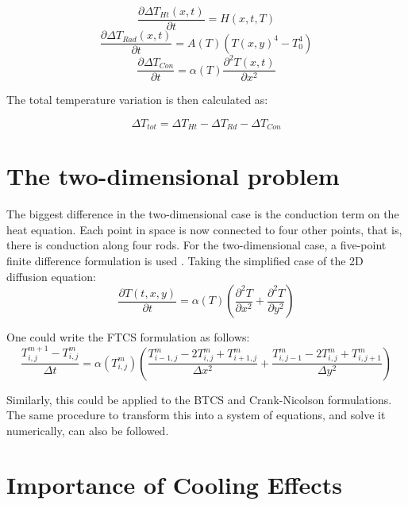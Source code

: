 \begin{equation}
    \frac{\partial \Delta T_{Ht} (x,t)}{\partial t} = H(x,t,T)
\end{equation}
\begin{equation}
    \frac{\partial \Delta T_{Rad} (x,t)}{\partial t} = A(T) \left(T(x,y)^4 - T_0^4\right)
\end{equation}
\begin{equation}
    \frac{\partial \Delta T_{Con}}{\partial t} = \alpha(T)\frac{\partial^2 T(x,t)}{\partial x^2}
\end{equation}

The total temperature variation is then calculated as: 

\begin{equation}
    \Delta T_{tot} = \Delta T_{Ht} - \Delta T_{Rd} - \Delta T_{Con}
\end{equation}

\section{The two-dimensional problem}

The biggest difference in the two-dimensional case is the conduction term on the heat equation. Each point in space is now connected to four other points, that is, there is conduction along four rods. For the two-dimensional case, a five-point finite difference formulation is used \parencite[][]{ref:FiniteDifference}. Taking the simplified case of the 2D diffusion equation: 
\begin{equation}
    \frac{\partial T(t,x,y)}{\partial t} = \alpha (T) \left(\frac{\partial^2 T}{\partial x^2}+\frac{\partial ^2 T}{\partial y^2}\right)
\end{equation}

One could write the FTCS formulation as follows: 
\begin{equation}
    \frac{T_{i,j}^{m+1} - T_{i,j}^{m}}{\Delta t} = \alpha(T_{i,j}^{m}) \left( \frac{T_{i-1,j}^{m} -2T_{i,j}^{m}+T_{i+1,j}^{m}}{\Delta x^2} +  \frac{T_{i,j-1}^{m}-2T_{i,j}^{m}+T_{i,j+1}^{m}}{\Delta y^2} \right)
\end{equation}

Similarly, this could be applied to the BTCS and Crank-Nicolson formulations. The same procedure to transform this into a system of equations, and solve it numerically, can also be followed. 

\section{Importance of Cooling Effects}

